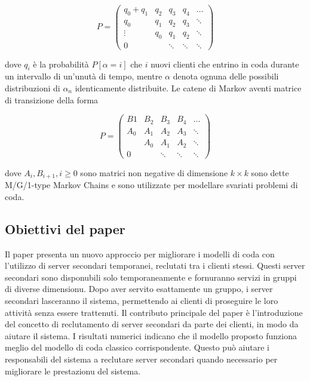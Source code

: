 \documentclass[11pt]{article}
\begin{document}
\begin{equation}
    P = \begin{pmatrix}
        q_0 + q_1 & q_2 & q_3 & q_4 & \ldots \\
        q_0 & q_1 & q_2 & q_3 & \ddots \\
        \vdots & q_0 & q_1 & q_2 & \ddots \\
        0 &  & \ddots & \ddots & \ddots
    \end{pmatrix}
\end{equation}

\noindent dove $q_i$ è la probabilità $P[\alpha=i]$ che $i$ nuovi clienti che entrino in coda durante un intervallo di un'unutà di tempo, mentre $\alpha$ denota ognuna delle possibili distribuzioni di $\alpha_n$ identicamente distribuite. Le catene di Markov aventi matrice di transizione della forma

\begin{equation}
    P = \begin{pmatrix}
        B1 & B_2 & B_3 & B_4 & \ldots \\
        A_0 & A_1 & A_2 & A_3 & \ddots \\
            & A_0 & A_1 & A_2 & \ddots \\
        0   &     & \ddots & \ddots & \ddots
    \end{pmatrix}
\end{equation}

\noindent dove $A_i, B_{i+1}, i \geq 0$ sono matrici non negative di dimensione $k \times k$ sono dette M/G/1-type Markov Chains e sono utilizzate per modellare svariati problemi di coda.

\subsection{Obiettivi del paper}

\noindent Il paper presenta un nuovo approccio per migliorare i modelli di coda con l'utilizzo di server secondari temporanei, reclutati tra i clienti stessi. Questi server secondari sono disponubili solo temporaneamente e fornuranno servizi in gruppi di diverse dimensionu. Dopo aver servito esattamente un gruppo, i server secondari lasceranno il sistema, permettendo ai clienti di proseguire le loro attività senza essere trattenuti. Il contributo principale del paper è l'introduzione del concetto di reclutamento di server secondari da parte dei clienti, in modo da aiutare il sistema. I risultati numerici indicano che il modello proposto funziona meglio del modello di coda classico corrispondente. Questo può aiutare i responsabili del sistema a reclutare server secondari quando necessario per migliorare le prestazionu del sistema. \\
\end{document}
